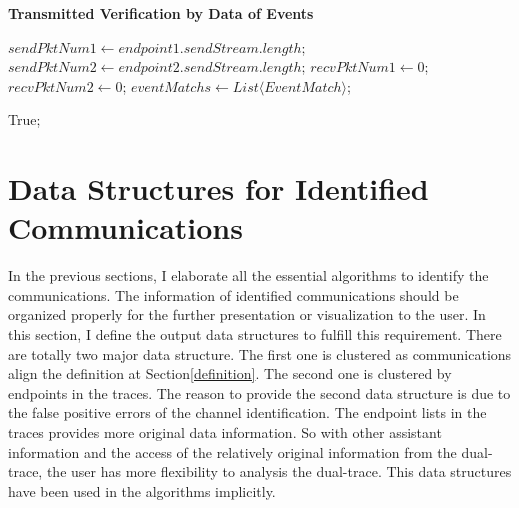 \begin{algorithm}[H]
\DontPrintSemicolon
\caption{{\bf Transmitted Verification by Data of Events } \label{dataAlg2}}
$sendPktNum1 \leftarrow endpoint1.sendStream.length$;\;
$sendPktNum2 \leftarrow endpoint2.sendStream.length$;\;
$recvPktNum1 \leftarrow 0$;\;
$recvPktNum2 \leftarrow 0$;\;
$eventMatchs \leftarrow List \langle EventMatch \rangle$;\;



 \KwRet True;\;
\end{algorithm}



\section{Data Structures for Identified Communications}
In the previous sections, I elaborate all the essential algorithms to identify the communications. The information of identified communications should be organized properly for the further presentation or visualization to the user. In this section, I define the output data structures to fulfill this requirement. There are totally two major data structure. The first one is clustered as communications align the definition at Section\ref{definition}. The second one is clustered by endpoints in the traces. The reason to provide the second data structure is due to the false positive errors of the channel identification. The endpoint lists in the traces provides more original data information. So with other assistant information and the access of the relatively original information from the dual-trace, the user has more flexibility to analysis the dual-trace. This data structures have been used in the algorithms implicitly.

